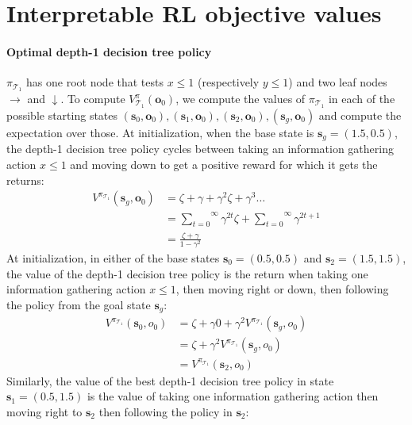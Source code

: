     

\section{Interpretable RL objective values}\label{calcs}
\paragraph{Optimal depth-1 decision tree policy} $\pi_{\mathcal{T}_1}$ has one root node that tests $x\leq1$ (respectively $y\leq1$) and two leaf nodes $\rightarrow$ and $\downarrow$. 
    To compute $V^\pi_{\mathcal{T}_1}(\boldsymbol{o}_0)$, we compute the values of $\pi_{\mathcal{T}_1}$ in each of the possible starting states $(\boldsymbol{s}_0, \boldsymbol{o}_0), (\boldsymbol{s}_1, \boldsymbol{o}_0), (\boldsymbol{s}_2, \boldsymbol{o}_0), (\boldsymbol{s}_g, \boldsymbol{o}_0)$ and compute the expectation over those. 
    At initialization, when the base state is $\boldsymbol{s}_g = (1.5, 0.5)$, the depth-1 decision tree policy cycles between taking an information gathering action $x\leq1$ and moving down to get a positive reward for which it gets the returns:
    \begin{align*}
        V^{\pi_{\mathcal{T}_1}} (\boldsymbol{s}_g, \boldsymbol{o}_0) &= \zeta + \gamma + \gamma^2 \zeta + \gamma^3 \dots \\
        &= \overset{\infty}{\underset{t=0}\sum} \gamma^{2t} \zeta + \overset{\infty}{\underset{t=0}\sum} \gamma^{2t+1} \\
        &= \frac{\zeta + \gamma}{1 - \gamma^2}
    \end{align*}
    At initialization, in either of the base states $\boldsymbol{s}_0=(0.5,0.5)$ and $\boldsymbol{s}_2=(1.5, 1.5)$, the value of the depth-1 decision tree policy is the return when taking one information gathering action $x\leq1$, then moving right or down, then following the policy from the goal state $\boldsymbol{s}_g$:
    \begin{align*}
        V^{\pi_{\mathcal{T}_1}} (\boldsymbol{s}_0, o_0) &= \zeta + \gamma 0 + \gamma^2 V^{\pi_{\mathcal{T}_1}} (\boldsymbol{s}_g, o_0) \\
        &= \zeta + \gamma^2 V^{\pi_{\mathcal{T}_1}} (\boldsymbol{s}_g, o_0) \\
        &= V^{\pi_{\mathcal{T}_1}} (\boldsymbol{s}_2, o_0)
    \end{align*}
    Similarly, the value of the best depth-1 decision tree policy in state $\boldsymbol{s}_1=(0.5,1.5)$ is the value of taking one information gathering action then moving right to $\boldsymbol{s}_2$ then following the policy in $\boldsymbol{s}_2$:
